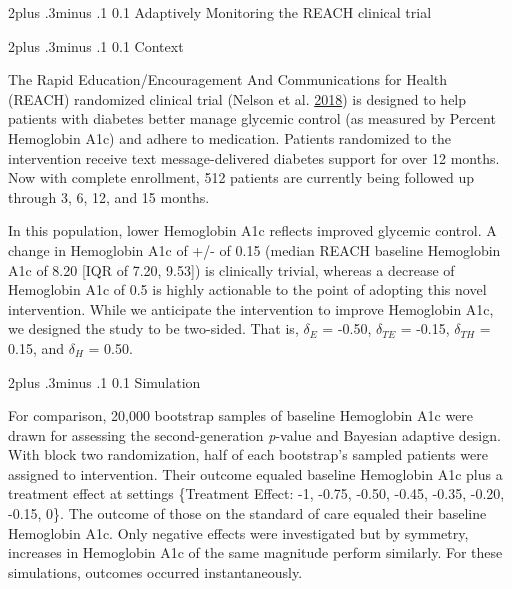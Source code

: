 \documentclass[12pt,oneside]{book}
\makeatletter
\newlength{\li}\setlength{\li}{14.48pt}
\newlength{\di}\setlength{\di}{-3.5mm}
\renewcommand\section{ \@startsection {section}{1}{\z@}%
    {2\@bls  plus .3\@bls minus .1\@bls}%
    {0.1\@bls}%
    {\centering\normalfont}}
\renewcommand\subsection{\@startsection {subsection}{2}{\z@}%
    {2\@bls  plus .3\@bls minus .1\@bls}%
    {0.1\@bls}%
    {\noindent\normalfont}}
\theoremstyle{definition}
\theoremstyle{definition}
\theoremstyle{definition}
\theoremstyle{remark}
\makeatother
\begin{document}
\hypertarget{adaptively-monitoring-the-reach-clinical-trial}{%
\section{Adaptively Monitoring the REACH clinical
trial}\label{adaptively-monitoring-the-reach-clinical-trial}}

\hypertarget{context}{%
\subsection{Context}\label{context}}

The Rapid Education/Encouragement And Communications for Health (REACH)
randomized clinical trial (Nelson et al.
\protect\hyperlink{ref-Nelson:2018bw}{2018}) is designed to help
patients with diabetes better manage glycemic control (as measured by
Percent Hemoglobin A1c) and adhere to medication. Patients randomized to
the intervention receive text message-delivered diabetes support for
over 12 months. Now with complete enrollment, 512 patients are currently
being followed up through 3, 6, 12, and 15 months.

In this population, lower Hemoglobin A1c reflects improved glycemic
control. A change in Hemoglobin A1c of +/- of 0.15 (median REACH
baseline Hemoglobin A1c of 8.20 {[}IQR of 7.20, 9.53{]}) is clinically
trivial, whereas a decrease of Hemoglobin A1c of 0.5 is highly
actionable to the point of adopting this novel intervention. While we
anticipate the intervention to improve Hemoglobin A1c, we designed the
study to be two-sided. That is, \(\delta_E\) = -0.50, \(\delta_{TE}\) =
-0.15, \(\delta_{TH}\) = 0.15, and \(\delta_H\) = 0.50.

\hypertarget{simulation}{%
\subsection{Simulation}\label{simulation}}

For comparison, 20,000 bootstrap samples of baseline Hemoglobin A1c were
drawn for assessing the second-generation \emph{p}-value and Bayesian
adaptive design. With block two randomization, half of each bootstrap's
sampled patients were assigned to intervention. Their outcome equaled
baseline Hemoglobin A1c plus a treatment effect at settings \{Treatment
Effect: -1, -0.75, -0.50, -0.45, -0.35, -0.20, -0.15, 0\}. The outcome
of those on the standard of care equaled their baseline Hemoglobin A1c.
Only negative effects were investigated but by symmetry, increases in
Hemoglobin A1c of the same magnitude perform similarly. For these
simulations, outcomes occurred instantaneously.
\end{document}
